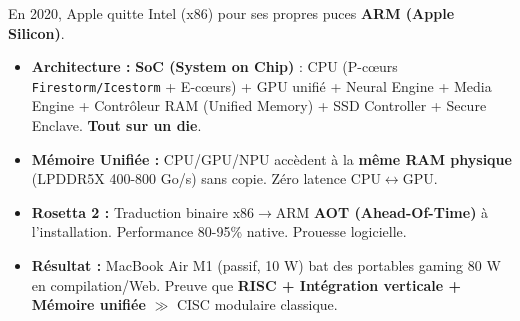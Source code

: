 \documentclass[11pt]{article}
\begin{document}
\begin{savaistu}
En 2020, Apple quitte Intel (x86) pour ses propres puces \textbf{ARM (Apple Silicon)}.
\begin{itemize}
    \item \textbf{Architecture :} \textbf{SoC (System on Chip)} : CPU (P-cœurs \texttt{Firestorm/Icestorm} + E-cœurs) + GPU unifié + Neural Engine + Media Engine + Contrôleur RAM (Unified Memory) + SSD Controller + Secure Enclave. \textbf{Tout sur un die}.
    \item \textbf{Mémoire Unifiée :} CPU/GPU/NPU accèdent à la \textbf{même RAM physique} (LPDDR5X 400-800 Go/s) sans copie. Zéro latence CPU$\leftrightarrow$GPU.
    \item \textbf{Rosetta 2 :} Traduction binaire x86$\to$ARM \textbf{AOT (Ahead-Of-Time)} à l'installation. Performance 80-95\% native. Prouesse logicielle.
    \item \textbf{Résultat :} MacBook Air M1 (passif, 10 W) bat des portables gaming 80 W en compilation/Web. Preuve que \textbf{RISC + Intégration verticale + Mémoire unifiée} $\gg$ CISC modulaire classique.
\end{itemize}
\end{savaistu}
\end{document}
